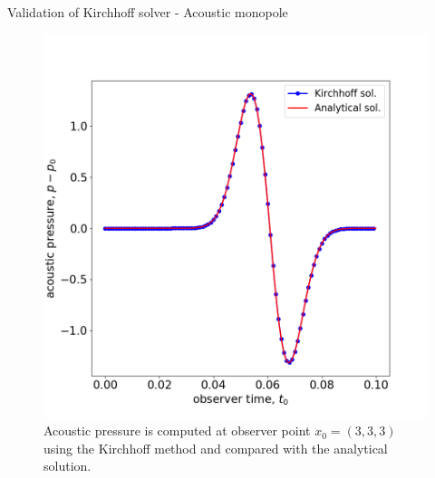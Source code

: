 \documentclass[10pt, aspectratio=169]{beamer}
\begin{document}
\begin{frame}{Validation of Kirchhoff solver - Acoustic monopole}
	\begin{figure}
		\centering
		\includegraphics[scale=0.26]{images/monopole.png}
		\caption{Acoustic pressure is computed at observer point $x_{0} = (3, 3, 3)$ using the Kirchhoff method and compared with the analytical solution.}
	\end{figure}
\end{frame}
\end{document}
